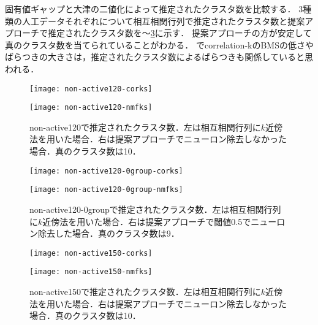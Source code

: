 固有値ギャップと大津の二値化によって推定されたクラスタ数を比較する．
3種類の人工データそれぞれについて相互相関行列で推定されたクラスタ数と提案アプローチで推定されたクラスタ数を〜\ref{fig:non-active150-ks}に示す．
提案アプローチの方が安定して真のクラスタ数を当てられていることがわかる．
でcorrelation-kのBMSの低さやばらつきの大きさは，推定されたクラスタ数によるばらつきも関係していると思われる．
\begin{figure}[htbp]
    \begin{minipage}{0.5\hsize}
			\begin{center}
					\texttt{[image: non-active120-corks]}
			\end{center}
		\end{minipage}
    \begin{minipage}{0.5\hsize}
			\begin{center}
					\texttt{[image: non-active120-nmfks]}
			\end{center}
		\end{minipage}
	\caption{non-active120で推定されたクラスタ数．左は相互相関行列に$k$近傍法を用いた場合．右は提案アプローチでニューロン除去しなかった場合．真のクラスタ数は10．}
	\label{fig:non-active120-ks}
\end{figure}
\begin{figure}[htbp]
    \begin{minipage}{0.5\hsize}
			\begin{center}
					\texttt{[image: non-active120-0group-corks]}
			\end{center}
		\end{minipage}
    \begin{minipage}{0.5\hsize}
			\begin{center}
					\texttt{[image: non-active120-0group-nmfks]}
			\end{center}
		\end{minipage}
	\caption{non-active120-0groupで推定されたクラスタ数．左は相互相関行列に$k$近傍法を用いた場合．右は提案アプローチで閾値0.5でニューロン除去した場合．真のクラスタ数は9．}
	\label{fig:non-active120-0group-ks}
\end{figure}
\begin{figure}[htbp]
    \begin{minipage}{0.5\hsize}
			\begin{center}
					\texttt{[image: non-active150-corks]}
			\end{center}
		\end{minipage}
    \begin{minipage}{0.5\hsize}
			\begin{center}
					\texttt{[image: non-active150-nmfks]}
			\end{center}
		\end{minipage}
	\caption{non-active150で推定されたクラスタ数．左は相互相関行列に$k$近傍法を用いた場合．右は提案アプローチでニューロン除去しなかった場合．真のクラスタ数は10．}
	\label{fig:non-active150-ks}
\end{figure}

